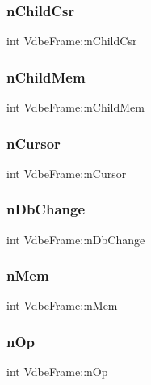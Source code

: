 \mbox{\label{struct_vdbe_frame_a2d2900348092258d12eb71057812429a}} 
\subsubsection{nChildCsr}
{\footnotesize\ttfamily int Vdbe\+Frame\+::n\+Child\+Csr}

\mbox{\label{struct_vdbe_frame_a833bdf519676567bc3a700cdedc6562d}} 
\subsubsection{nChildMem}
{\footnotesize\ttfamily int Vdbe\+Frame\+::n\+Child\+Mem}

\mbox{\label{struct_vdbe_frame_a9b74ca630c19ab905db3be4e78dbd9e1}} 
\subsubsection{nCursor}
{\footnotesize\ttfamily int Vdbe\+Frame\+::n\+Cursor}

\mbox{\label{struct_vdbe_frame_ab25b753f6356e7b9561717a58cfa4181}} 
\subsubsection{nDbChange}
{\footnotesize\ttfamily int Vdbe\+Frame\+::n\+Db\+Change}

\mbox{\label{struct_vdbe_frame_ab340f2b5f6d6e09a872f5f8a64fec245}} 
\subsubsection{nMem}
{\footnotesize\ttfamily int Vdbe\+Frame\+::n\+Mem}

\mbox{\label{struct_vdbe_frame_acffd5d53fbb5cb55e257c34a547c1762}} 
\subsubsection{nOp}
{\footnotesize\ttfamily int Vdbe\+Frame\+::n\+Op}

